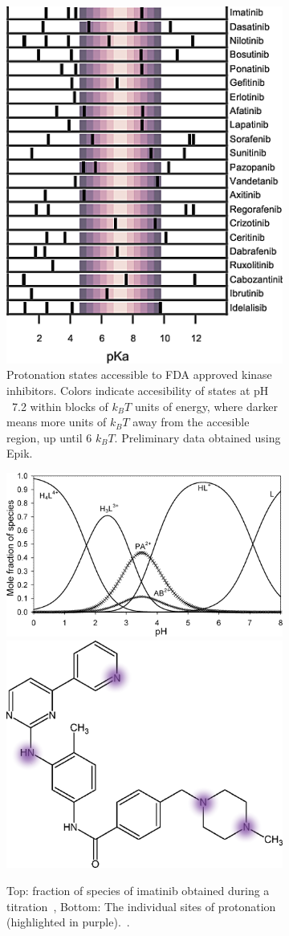 \documentclass[10pt,final]{article}
\newcommand{\pH}{p$\mathrm{H}$\ }
\begin{document}
\begin{figure}[H]
\centering
\begin{subfigure}{.5\textwidth}
  \centering
	\includegraphics[width=0.7\linewidth]{figures/inhibitor-pKas.png}
	\caption{Protonation states accessible to FDA approved kinase inhibitors. Colors indicate accesibility of states at \pH 7.2 within blocks of $k_BT$ units of energy, where darker means more units of $k_BT$ away from the accesible region, up until 6 $k_BT$. Preliminary data obtained using Epik.~\cite{Shelley2007a,Greenwood2010a}}
	\label{figure:pka-kinase}
\end{subfigure}%
\begin{subfigure}{.5\textwidth}
  \centering
  \includegraphics[width=0.6\linewidth]{figures/imatinib_curve.png}
  \includegraphics[width=0.5\linewidth]{figures/imatinib_groups.png}
  \caption{Top: fraction of species of imatinib obtained during a titration~\cite{Szakacs2005a}, Bottom: The individual sites of protonation (highlighted in purple).~\cite{Szakacs2005a}.}
  \label{fig:imatinib-pKa}
\end{subfigure}
\caption{}
\label{figure:kinase-pKa}
\end{figure}
\end{document}
